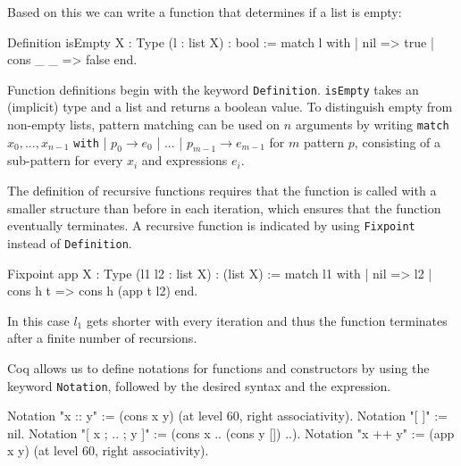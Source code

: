 \documentclass[paper = a4, fleqn, abstract=on, twoside]{scrreprt}
\newcommand{\coqinline}[1]{\texttt{#1}}
\begin{document}
Based on this we can write a function that determines if a list is empty:
\begin{coqcode}
Definition isEmpty {X : Type} (l : list X) : bool := 
  match l with
  | nil      => true
  | cons _ _ => false
  end.
\end{coqcode}
Function definitions begin with the keyword \coqinline{Definition}. \coqinline{isEmpty} takes an (implicit) type and a list and returns a boolean value.
To distinguish empty from non-empty lists, pattern matching can be used on $n$ arguments by writing \coqinline{match} $x_{0},...,x_{n-1}$ \coqinline{with} | $p_{0} \rightarrow e_{0}$ | ... | $p_{m-1} \rightarrow e_{m-1}$ for $m$ pattern $p$, consisting of a sub-pattern for every $x_{i}$ and expressions $e_{i}$.

The definition of recursive functions requires that the function is called with a smaller structure than before in each iteration, which ensures that the function eventually terminates. A recursive function is indicated by using \coqinline{Fixpoint} instead of \coqinline{Definition}.
\begin{coqcode}
Fixpoint app {X : Type} (l1 l2 : list X) : (list X) :=
  match l1 with
  | nil => l2
  | cons h t => cons h (app t l2)
  end.
\end{coqcode}
In this case $l_{1}$ gets shorter with every iteration and thus the function terminates after a finite number of recursions. 

Coq allows us to define notations for functions and constructors by using the keyword \coqinline{Notation}, followed by the desired syntax and the expression. 
\begin{coqcode}
Notation "x :: y" := (cons x y) (at level 60, right associativity).
Notation "[ ]" := nil.
Notation "[ x ; .. ; y ]" := (cons x .. (cons y []) ..).
Notation "x ++ y" := (app x y) (at level 60, right associativity).
\end{coqcode}
\end{document}
